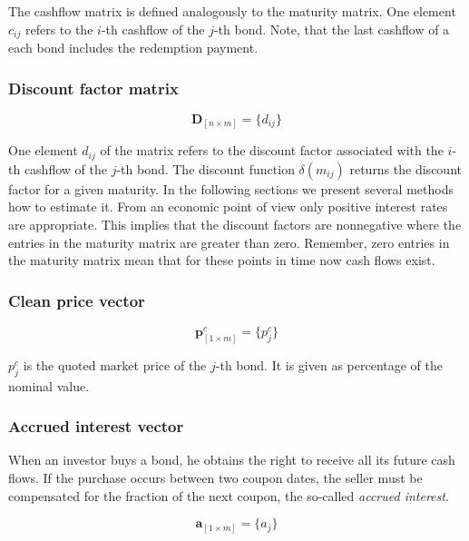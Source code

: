 The cashflow matrix is defined analogously to the maturity matrix. One element $c_{ij}$ refers to the $i$-th cashflow of the $j$-th bond. Note, that the last cashflow of a each bond includes the redemption payment.

\subsubsection*{Discount factor matrix}

 \begin{equation*}\label{discountm}
\bm{D}_{\left[n\times m\right]}= \{d_{ij}\}
\end{equation*}

One element $d_{ij}$ of the matrix refers to the discount factor associated with the $i$-th cashflow of the $j$-th bond. The discount function $\delta(m_{ij})$ returns the discount factor for a given maturity. In the following sections we present several methods how to estimate it. From an economic point of view only positive interest rates are appropriate. This implies that the discount factors are nonnegative where the entries in the maturity matrix are greater than zero. Remember, zero entries in the maturity matrix mean that for these points in time now cash flows exist.

\subsubsection*{Clean price vector}

 \begin{equation*}\label{pc}
\bm{p}^c_{\left[1\times m\right]}= \{p^c_j\}
\end{equation*}

$p_{j}^c$ is the quoted market price of the $j$-th bond. It is given as percentage of the nominal value.

\subsubsection*{Accrued interest vector}

When an investor buys a bond, he obtains the right to receive all its future cash flows. If the purchase occurs between two coupon dates, the seller must be compensated for the fraction of the next coupon, the so-called \emph{accrued interest}.

  \begin{equation*}\label{a}
\bm{a}_{\left[1\times m\right]}= \{a_j\}
\end{equation*}


